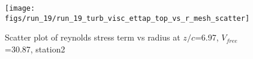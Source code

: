 \begin{figure}[H]
\centering
\texttt{[image: figs/run\_19/run\_19\_turb\_visc\_ettap\_top\_vs\_r\_mesh\_scatter]}
\caption{Scatter plot of reynolds stress term vs radius at $z/c$=6.97, $V_{free}$=30.87, station2}
\label{fig:run_19_turb_visc_ettap_top_vs_r_mesh_scatter}
\end{figure}


